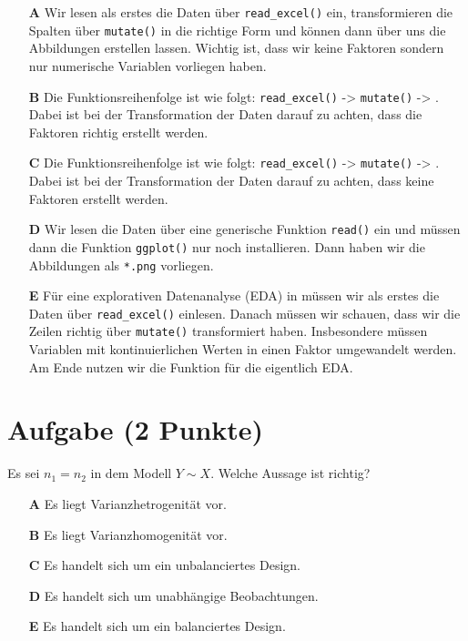 \documentclass[a4paper, 9pt]{scrartcl}\usepackage[]{graphicx}\usepackage[]{xcolor}
\begin{document}
\begin{enumerate}
\item [\textbf{A} \msquare] Wir lesen als erstes die Daten über \texttt{read\_excel()} ein, transformieren die Spalten über \texttt{mutate()} in die richtige Form und können dann  über  uns die Abbildungen erstellen lassen. Wichtig ist, dass wir keine Faktoren sondern nur numerische Variablen vorliegen haben.
\item [\textbf{B} \msquare] Die Funktionsreihenfolge ist wie folgt: \texttt{read\_excel()} ->  \texttt{mutate()} -> . Dabei ist bei der Transformation der Daten darauf zu achten, dass die Faktoren richtig erstellt werden.
\item [\textbf{C} \msquare] Die Funktionsreihenfolge ist wie folgt: \texttt{read\_excel()} ->  \texttt{mutate()} -> . Dabei ist bei der Transformation der Daten darauf zu achten, dass keine Faktoren erstellt werden.
\item [\textbf{D} \msquare] Wir lesen die Daten über eine generische Funktion \texttt{read()} ein und müssen dann die Funktion \texttt{ggplot()} nur noch installieren. Dann haben wir die Abbildungen als \texttt{*.png} vorliegen.
\item [\textbf{E} \msquare] Für eine explorativen Datenanalyse (EDA) in \Rlogo müssen wir als erstes die Daten über \texttt{read\_excel()} einlesen. Danach müssen wir schauen, dass wir die Zeilen richtig über \texttt{mutate()} transformiert haben. Insbesondere müssen Variablen mit kontinuierlichen Werten in einen Faktor umgewandelt werden. Am Ende nutzen wir die Funktion  für die eigentlich EDA.
\end{enumerate}

\section{Aufgabe \hfill (2 Punkte)}



Es sei $n_1 = n_2$ in dem Modell $Y \sim X$. Welche Aussage ist richtig?



\begin{enumerate}
\item [\textbf{A} \msquare] Es liegt Varianzhetrogenität vor.
\item [\textbf{B} \msquare] Es liegt Varianzhomogenität vor.
\item [\textbf{C} \msquare] Es handelt sich um ein unbalanciertes Design.
\item [\textbf{D} \msquare] Es handelt sich um unabhängige Beobachtungen.
\item [\textbf{E} \msquare] Es handelt sich um ein balanciertes Design.
\end{enumerate}
\end{document}
